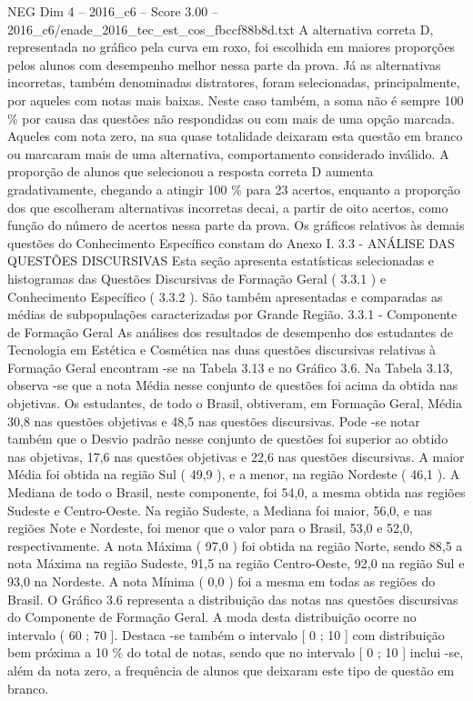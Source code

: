 \begin{textsample}{NEG Dim 4 – 2016\_c6 – Score 3.00 – 2016\_c6/enade\_2016\_tec\_est\_cos\_fbccf88b8d.txt}
A alternativa correta D, representada no gráfico pela curva em roxo, foi escolhida em maiores proporções pelos alunos com desempenho melhor nessa parte da prova.
Já as alternativas incorretas, também denominadas distratores, foram selecionadas, principalmente, por aqueles com notas mais baixas.
Neste caso também, a soma não é sempre 100 \% por causa das questões não respondidas ou com mais de uma opção marcada.
Aqueles com nota zero, na sua quase totalidade deixaram esta questão em branco ou marcaram mais de uma alternativa, comportamento considerado inválido.
A proporção de alunos que selecionou a resposta correta D aumenta gradativamente, chegando a atingir 100 \% para 23 acertos, enquanto a proporção dos que escolheram alternativas incorretas decai, a partir de oito acertos, como função do número de acertos nessa parte da prova.
Os gráficos relativos às demais questões do Conhecimento Específico constam do Anexo I. 3.3 - ANÁLISE DAS QUESTÕES DISCURSIVAS Esta seção apresenta estatísticas selecionadas e histogramas das Questões Discursivas de Formação Geral ( 3.3.1 ) e Conhecimento Específico ( 3.3.2 ).
São também apresentadas e comparadas as médias de subpopulações caracterizadas por Grande Região. 3.3.1 - Componente de Formação Geral As análises dos resultados de desempenho dos estudantes de Tecnologia em Estética e Cosmética nas duas questões discursivas relativas à Formação Geral encontram -se na Tabela 3.13 e no Gráfico 3.6.
Na Tabela 3.13, observa -se que a nota Média nesse conjunto de questões foi acima da obtida nas objetivas.
Os estudantes, de todo o Brasil, obtiveram, em Formação Geral, Média 30,8 nas questões objetivas e 48,5 nas questões discursivas.
Pode -se notar também que o Desvio padrão nesse conjunto de questões foi superior ao obtido nas objetivas, 17,6 nas questões objetivas e 22,6 nas questões discursivas.
A maior Média foi obtida na região Sul ( 49,9 ), e a menor, na região Nordeste ( 46,1 ).
A Mediana de todo o Brasil, neste componente, foi 54,0, a mesma obtida nas regiões Sudeste e Centro-Oeste.
Na região Sudeste, a Mediana foi maior, 56,0, e nas regiões Note e Nordeste, foi menor que o valor para o Brasil, 53,0 e 52,0, respectivamente.
A nota Máxima ( 97,0 ) foi obtida na região Norte, sendo 88,5 a nota Máxima na região Sudeste, 91,5 na região Centro-Oeste, 92,0 na região Sul e 93,0 na Nordeste.
A nota Mínima ( 0,0 ) foi a mesma em todas as regiões do Brasil.
O Gráfico 3.6 representa a distribuição das notas nas questões discursivas do Componente de Formação Geral.
A moda desta distribuição ocorre no intervalo ( 60 ; 70 ].
Destaca -se também o intervalo [ 0 ; 10 ] com distribuição bem próxima a 10 \% do total de notas, sendo que no intervalo [ 0 ; 10 ] inclui -se, além da nota zero, a frequência de alunos que deixaram este tipo de questão em branco.

\end{textsample}
